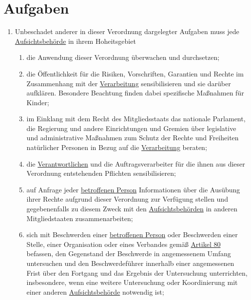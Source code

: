 \chapter{Aufgaben}
\label{ch:57}


\begin{enumerate}

  \item Unbeschadet anderer in dieser Verordnung dargelegter Aufgaben muss jede \hyperref[itm:04-21]{Aufsichtsbehörde} in ihrem Hoheitsgebiet
\label{itm:57-1}

  \begin{enumerate}
  
    \item die Anwendung dieser Verordnung überwachen und durchsetzen;
    \label{itm:57-1a}

    \item die Öffentlichkeit für die Risiken, Vorschriften, Garantien und Rechte im Zusammenhang mit der \hyperref[itm:04-2]{Verarbeitung}
     sensibilisieren und sie darüber aufklären. Besondere Beachtung finden dabei spezifische Maßnahmen für Kinder;
    \label{itm:57-1b}

    \item im Einklang mit dem Recht des Mitgliedsstaats das nationale Parlament, die Regierung und andere Einrichtungen
     und Gremien über legislative und administrative Maßnahmen zum Schutz der Rechte und Freiheiten natürlicher
     Personen in Bezug auf die \hyperref[itm:04-2]{Verarbeitung} beraten;
    \label{itm:57-1c}

    \item die \hyperref[itm:04-7]{Verantwortlichen} und die Auftragsverarbeiter für die ihnen aus dieser Verordnung entstehenden Pflichten
     sensibilisieren;
    \label{itm:57-1d}

    \item auf Anfrage jeder \hyperref[itm:04-1]{betroffenen Person} Informationen über die Ausübung ihrer Rechte aufgrund dieser Verordnung
     zur Verfügung stellen und gegebenenfalls zu diesem Zweck mit den \hyperref[itm:04-21]{Aufsichtsbehörden} in anderen Mitgliedstaaten
     zusammenarbeiten;
    \label{itm:57-1e}

    \item sich mit Beschwerden einer \hyperref[itm:04-1]{betroffenen Person} oder Beschwerden einer Stelle, einer Organisation oder eines
     Verbandes gemäß \hyperref[ch:80]{Artikel 80} befassen, den Gegenstand der Beschwerde in angemessenem Umfang
     untersuchen und den Beschwerdeführer innerhalb einer angemessenen Frist über den Fortgang und das Ergebnis der
     Untersuchung unterrichten, insbesondere, wenn eine weitere Untersuchung oder Koordinierung mit einer anderen
     \hyperref[itm:04-21]{Aufsichtsbehörde} notwendig ist;
    \label{itm:57-1f}


\end{enumerate}
\end{enumerate}
